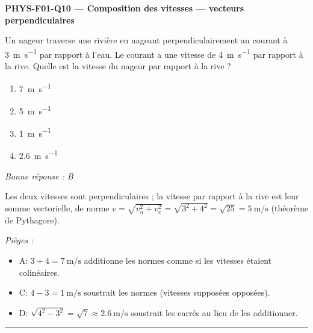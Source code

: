 \documentclass[11pt,a4paper]{article}
\newcommand{\vv}[1]{\vec{#1}}\newcommand{\ds}{\displaystyle}
\begin{document}
\noindent\textbf{PHYS-F01-Q10 --- Composition des vitesses --- vecteurs perpendiculaires}\par
Un nageur traverse une rivière en nageant perpendiculairement au courant à \qty{3}{\metre\per\second} par rapport à l'eau. Le courant a une vitesse de \qty{4}{\metre\per\second} par rapport à la rive. Quelle est la vitesse du nageur par rapport à la rive ?
\begin{center}
\end{center}
\begin{enumerate}[label=\Alph*)]
\item \qty{7}{\metre\per\second}
\item \qty{5}{\metre\per\second}
\item \qty{1}{\metre\per\second}
\item \qty{2.6}{\metre\per\second}
\end{enumerate}
\textit{Bonne réponse : B}\par
Les deux vitesses sont perpendiculaires ; la vitesse par rapport à la rive est leur somme vectorielle, de norme $v=\sqrt{v_n^2+v_c^2}=\sqrt{3^2+4^2}=\sqrt{25}=\qty{5}{\metre\per\second}$ (théorème de Pythagore).\par
\textit{Pièges :}
\begin{itemize}
\item A: $3+4=\qty{7}{\metre\per\second}$ additionne les normes comme si les vitesses étaient colinéaires.
\item C: $4-3=\qty{1}{\metre\per\second}$ soustrait les normes (vitesses supposées opposées).
\item D: $\sqrt{4^2-3^2}=\sqrt{7}\approx\qty{2.6}{\metre\per\second}$ soustrait les carrés au lieu de les additionner.
\end{itemize}
\vspace{8pt}\hrule\vspace{8pt}
\end{document}
